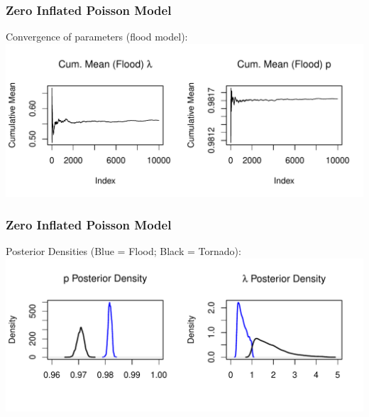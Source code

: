 \documentclass{beamer}
\begin{document}
	\begin{frame}
		\frametitle{Zero Inflated Poisson Model}
		Convergence of parameters (flood model):
		\centering
		\includegraphics[width=.9\textwidth]{figure/ZIP_Flood_Conv.pdf} 
	\end{frame}
	\begin{frame}
		\frametitle{Zero Inflated Poisson Model}
		Posterior Densities (Blue = Flood; Black = Tornado):
		\centering
		\includegraphics[width=.9\textwidth]{figure/ZIP_Density.pdf} 
	\end{frame}	
\end{document}
